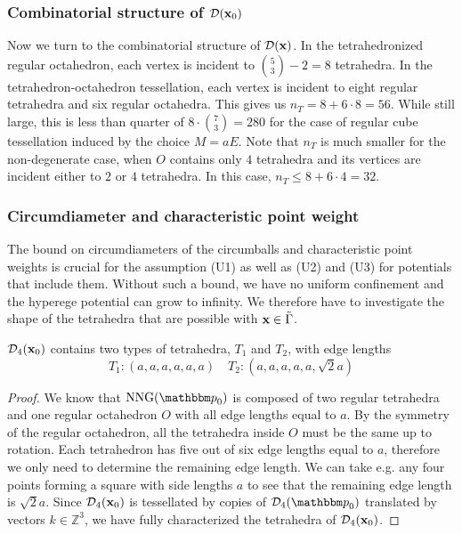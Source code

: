 \subsubsection{Combinatorial structure of $\mathcal D({\mathbf{x}}_0)$}
Now we turn to the combinatorial structure of $\mathcal D({\mathbf{x}})$. In the tetrahedronized regular octahedron, each vertex is incident to $\binom{5}{3}-2=8$ tetrahedra. In the tetrahedron-octahedron tessellation, each  vertex is incident to eight regular tetrahedra and six regular octahedra. This gives us $n_T = 8 + 6\cdot 8 = 56$. While still large, this is less than quarter of $8\cdot \binom{7}{3} = 280$ for the case of regular cube tessellation induced by the choice $M=aE$. Note that $n_T$ is much smaller for the non-degenerate case, when $O$ contains only $4$ tetrahedra and its vertices are incident either to $2$ or $4$ tetrahedra. In this case, $n_T\leq 8+6\cdot 4 = 32$.


\subsubsection{Circumdiameter and characteristic point weight}
The bound on circumdiameters of the circumballs and characteristic point weights is crucial for the assumption (U1) as well as (U2) and (U3) for potentials that include them. Without such a bound, we have no uniform confinement and the hyperege potential can grow to infinity. We therefore have to investigate the shape of the tetrahedra that are possible with ${\mathbf{x}} \in \tilde\Gamma$. 

\begin{proposition} $\mathcal D_4({\mathbf{x}}_0)$ contains two types of tetrahedra, $T_1$ and $T_2$, with edge lengths
$$T_1: (a,a,a,a,a,a) \quad T_2:(a,a,a,a,a,\sqrt 2a)$$
\end{proposition}
\begin{proof}
We know that $\text{NNG}(\p_0)$ is composed of two regular tetrahedra and one regular octahedron $O$ with all edge lengths equal to $a$. By the symmetry of the regular octahedron, all the tetrahedra inside $O$ must be the same up to rotation. Each tetrahedron has five out of six edge lengths equal to $a$, therefore we only need to determine the remaining edge length. We can take e.g. any four points forming a square with side lengths $a$ to see that the remaining edge length is $\sqrt 2a$.
Since $\mathcal D_4({\mathbf{x}}_0)$ is tessellated by copies of $\mathcal D_4(\p_0)$ translated by vectors $k\in\mathbb Z^3$, we have fully characterized the tetrahedra of $\mathcal D_4({\mathbf{x}}_0)$. 
\end{proof}

